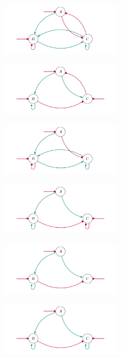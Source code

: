 \documentclass[varwidth=18cm, border=10pt]{standalone}
\begin{document}
\begin{figure}
\begin{subfigure}{6cm}
\caption{}
\end{subfigure}
\begin{subfigure}{6cm}
\centering\includegraphics[width=5cm]{oommppmpmmppo.pdf}
\caption{}
\end{subfigure}
\begin{subfigure}{6cm}
\centering\includegraphics[width=5cm]{oommpppompmom.pdf}
\caption{}
\end{subfigure}
\begin{subfigure}{6cm}
\centering\includegraphics[width=5cm]{ooomppmpmmppo.pdf}
\caption{}
\end{subfigure}
\begin{subfigure}{6cm}
\centering\includegraphics[width=5cm]{ooompppompmmm.pdf}
\caption{}
\end{subfigure}
\begin{subfigure}{6cm}
\centering\includegraphics[width=5cm]{ooompppompmom.pdf}
\caption{}
\end{subfigure}
\begin{subfigure}{6cm}
\centering\includegraphics[width=5cm]{ooompppompmpm.pdf}

\end{subfigure}
\end{figure}
\end{document}
